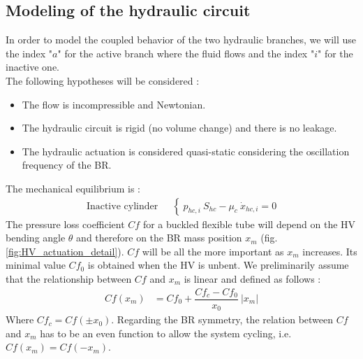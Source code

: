 \documentclass[3p,twocolumn,preprint]{elsarticle}
\begin{document}
	\subsection{Modeling of the hydraulic circuit}	
	\label{subsec:The hydraulic circuit}

In order to model the coupled behavior of the two hydraulic branches, we will use the index "$a$" for the active branch where the fluid flows and the index "$i$" for the inactive one. \\
The following hypotheses will be considered :
\begin{itemize}
	\item The flow is incompressible and Newtonian.
	\item The hydraulic circuit is rigid (no volume change) and there is no leakage.
	\item The hydraulic actuation is considered quasi-static considering the oscillation frequency of the BR.
\end{itemize}
The mechanical equilibrium is :
\begin{align}
	\text{Inactive cylinder ~}& \left\{~
	p_{hc,i}\ S_{hc} - \mu_{c}\ \dot{x}_{hc,i} = 0
	\right.
	\label{eq:equilibre_dynamique_piston_ferme}
\end{align}
The pressure loss coefficient $Cf$ for a buckled flexible tube will depend on the HV bending angle $\theta$ and therefore on the BR mass position $x_m$ (fig. \ref{fig:HV_actuation_detail}). $Cf$ will be all the more important as $x_m$ increases. Its minimal value $Cf_0$ is obtained when the HV is unbent. We preliminarily assume that the relationship between $Cf$ and $x_m$ is linear and defined as follows :
\begin{align}
Cf(x_m) & = Cf_0 + \dfrac{Cf_c - Cf_0}{x_0}\ |x_m| 
\label{eq:Cf(x_m)_linear}
\end{align}
Where $Cf_c=Cf(\pm x_0)$. Regarding the BR symmetry, the relation between $Cf$ and $x_m$ has to be an even function to allow the system cycling, i.e. $Cf(x_m) = Cf(-x_m)$.
\end{document}

